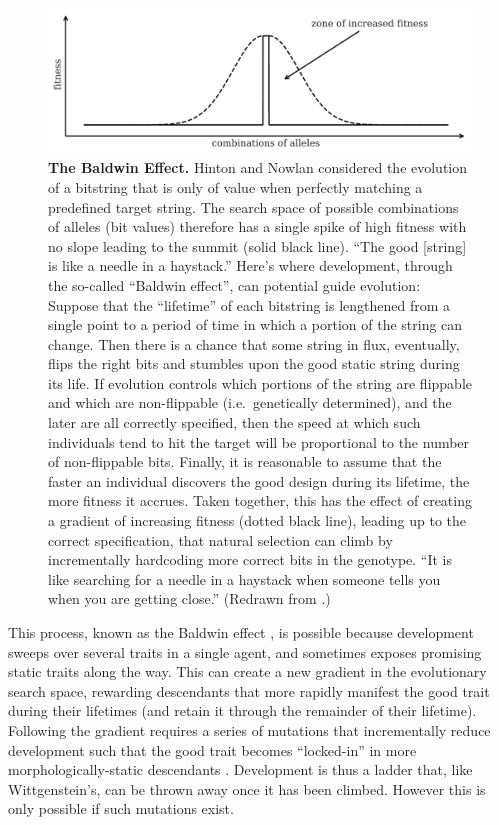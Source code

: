 \begin{figure}[t]
\centering
\includegraphics[width=\linewidth]{fig/Baldwin2D}
\caption{\label{fig:baldwin2d}\textbf{The Baldwin Effect.} Hinton and Nowlan \cite{hinton1987learning} considered the evolution of a bitstring that is only of value when perfectly matching a predefined target string. 
The search space of possible combinations of alleles (bit values) therefore has a single spike of high fitness with no slope leading to the summit (solid black line).
``The good [string] is like a needle in a haystack.''
Here's where development, through the so-called ``Baldwin effect'', can potential guide evolution:
Suppose that the ``lifetime'' of each bitstring is lengthened from a single point to a period of time in which a portion of the string can change. 
Then there is a chance that some string in flux, eventually, flips the right bits and stumbles upon the good static string during its life.
If evolution controls which portions of the string are flippable and which are non-flippable (i.e.~genetically determined),
and the later are all correctly specified,
then the speed at which such individuals tend to hit the target will be proportional to the number of non-flippable bits.
Finally, it is reasonable to assume that the faster an individual discovers the good design during its lifetime, the more fitness it accrues.
Taken together, this has the effect of creating a gradient of increasing fitness (dotted black line), leading up to the correct specification, that natural selection can climb by incrementally hardcoding more correct bits in the genotype.
``It is like searching for a needle in a haystack when someone tells you when you are getting close.''
(Redrawn from \cite{hinton1987learning}.)
}
\end{figure}


This process, known as the Baldwin effect \cite{baldwin1896new,simpson1953baldwin,dennett2003baldwin}, is possible because development sweeps over several traits in a single agent, and sometimes exposes promising static traits along the way.
This can create a new gradient in the evolutionary search space, rewarding descendants that more rapidly manifest the good trait during their lifetimes (and retain it through the remainder of their lifetime).
Following the gradient requires a series of mutations that incrementally reduce development such that the good trait becomes ``locked-in'' in more morphologically-static descendants \cite{waddington1942canalization}.
Development is thus a ladder that, like Wittgenstein's, can be thrown away once it has been climbed.
However this is only possible if such mutations exist.


